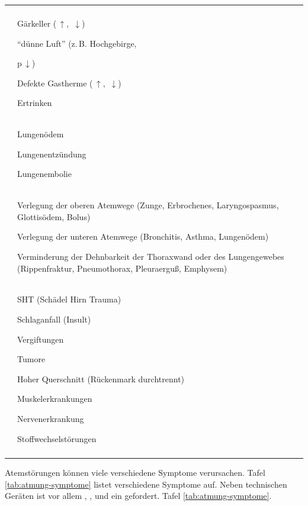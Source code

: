 \begin{table}[H]
\begin{gWideParEnv}

\begin{tabulary}{\linewidth}[H]{LL}
  & 
\\\addlinespace\midrule\addlinespace
{}
 &
Gärkeller (\,${\uparrow}$, \,${\downarrow}$)

"`dünne Luft"' (z.\,B. Hochgebirge,

p\,${\downarrow}$)

Defekte Gastherme (\,${\uparrow}$,
\,${\downarrow}$)

Ertrinken
\\\addlinespace
{}
 &
Lungenödem

Lungenentzündung

Lungenembolie
\\\addlinespace
{}
 &
Verlegung der oberen Atemwege (Zunge, Erbrochenes, Laryngospasmus,
         Glottisödem, Bolus)

Verlegung der unteren Atemwege (Bronchitis, Asthma,
Lungenödem)

Verminderung der Dehnbarkeit der Thoraxwand oder des Lungengewebes
     (Rippenfraktur, Pneumothorax, Pleuraerguß, Emphysem)
\\\addlinespace
{}
 &
SHT (Schädel Hirn Trauma)

Schlaganfall (Insult)

Vergiftungen

Tumore

Hoher Querschnitt (Rückenmark durchtrennt)

Muskelerkrankungen

Nervenerkrankung

Stoffwechselstörungen
\\\addlinespace\bottomrule
\end{tabulary}
\end{gWideParEnv}
\end{table}


{
Atemstörungen können viele verschiedene Symptome verursachen. Tafel
\ref{tab:atmung-symptome} listet verschiedene Symptome auf. Neben technischen
Geräten ist vor allem , ,  und ein
 gefordert.
}{Tafel \ref{tab:atmung-symptome}.}{}{}{}


